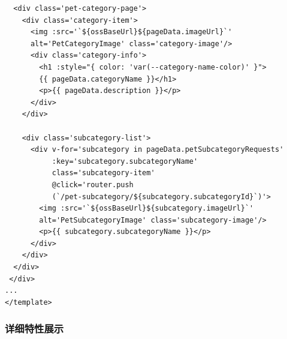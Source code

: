 \begin{itemize}
\begin{verbatim}
  <div class='pet-category-page'>
    <div class='category-item'>
      <img :src='`${ossBaseUrl}${pageData.imageUrl}`' 
      alt='PetCategoryImage' class='category-image'/>
      <div class='category-info'>
        <h1 :style="{ color: 'var(--category-name-color)' }">
        {{ pageData.categoryName }}</h1>
        <p>{{ pageData.description }}</p>
      </div>
    </div>
	
    <div class='subcategory-list'>
      <div v-for='subcategory in pageData.petSubcategoryRequests'
           :key='subcategory.subcategoryName'
           class='subcategory-item'
           @click='router.push
           (`/pet-subcategory/${subcategory.subcategoryId}`)'>
        <img :src='`${ossBaseUrl}${subcategory.imageUrl}`' 
        alt='PetSubcategoryImage' class='subcategory-image'/>
        <p>{{ subcategory.subcategoryName }}</p>
      </div>
    </div>
  </div>
 </div>
...
</template>
	\end{verbatim}

\end{itemize}

\subsubsection{详细特性展示}

